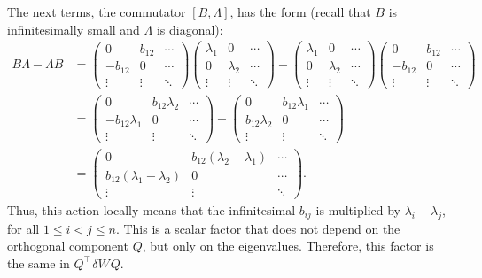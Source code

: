 \documentclass[letterpaper,11pt,oneside,reqno]{book}
\numberwithin{equation}{chapter}  %
\newcommand{\ssp}{\hspace{1pt}}
\theoremstyle{definition}
\begin{document}
The next terms, the commutator $[B,\Lambda]$, has the form
(recall that $B$ is infinitesimally small and $\Lambda$ is diagonal):
\begin{align*}
B\Lambda-\Lambda B&=
\begin{pmatrix}
	0 & b_{12} & \cdots \\
	-b_{12} & 0 & \cdots \\
	\vdots & \vdots & \ddots
\end{pmatrix}
\begin{pmatrix}
	\lambda_1 & 0 & \cdots \\
	0 & \lambda_2 & \cdots \\
	\vdots & \vdots & \ddots
\end{pmatrix}-
\begin{pmatrix}
	\lambda_1 & 0 & \cdots \\
	0 & \lambda_2 & \cdots \\
	\vdots & \vdots & \ddots
\end{pmatrix}
\begin{pmatrix}
	0 & b_{12} & \cdots \\
	-b_{12} & 0 & \cdots \\
	\vdots & \vdots & \ddots
\end{pmatrix}\\&
=
\begin{pmatrix}
	0 & b_{12}\lambda_2 & \cdots \\
	-b_{12}\lambda_1 & 0 & \cdots \\
	\vdots & \vdots & \ddots
\end{pmatrix}
-
\begin{pmatrix}
	0 & b_{12}\lambda_1 & \cdots \\
	b_{12}\lambda_2 & 0 & \cdots \\
	\vdots & \vdots & \ddots
\end{pmatrix}
\\&=
\begin{pmatrix}
	0 &b_{12}(\lambda_2-\lambda_1) & \cdots \\
	b_{12}(\lambda_1-\lambda_2) & 0 & \cdots \\
	\vdots & \vdots & \ddots
\end{pmatrix}.
\end{align*}
Thus, this action locally means that the
infinitesimal $b_{ij}$ is multiplied by $\lambda_i-\lambda_j$,
for all $1\le i<j\le n$.
This is a scalar factor that does not depend on
the orthogonal component $Q$, but only on the eigenvalues.
Therefore, this factor is the same in
$Q^\top \ssp \delta W \ssp Q$.
\end{document}
